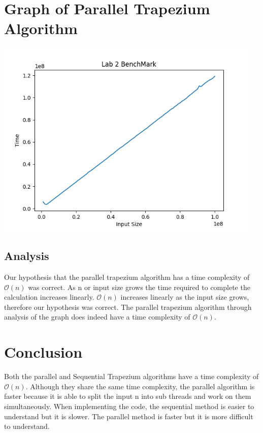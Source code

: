 \documentclass[12pt]{article}
\begin{document}
\section{Graph of Parallel Trapezium Algorithm}

\begin{center}
\includegraphics[width = 5in]{Parallelplot100.png}
\end{center}

\subsection{Analysis}
Our hypothesis that the parallel trapezium algorithm has a time complexity of $\mathcal{O}(n)$ was correct. As n or input size grows the time required to complete the calculation increases linearly.  $ \mathcal{O}(n)$ increases linearly as the input size grows, therefore our hypothesis was correct. The parallel trapezium algorithm through analysis of the graph does indeed have a time complexity of $ \mathcal{O}(n)$.

\newpage

\section{Conclusion}
Both the parallel and Sequential Trapezium algorithms have a time complexity of $ \mathcal{O}(n)$. Although they share the same time complexity, the parallel algorithm is faster because it is able to split the input n into sub threads and work on them simultaneously. When implementing the code, the sequential method is easier to understand but it is slower. The parallel method is faster but it is more difficult to understand.
\end{document}
